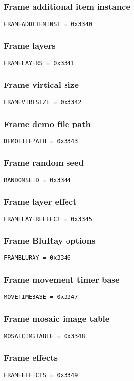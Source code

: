 \documentclass{article}
\begin{document}
\subsubsection{Frame additional item instance}
\verb|FRAMEADDITEMINST = 0x3340|

\subsubsection{Frame layers}
\verb|FRAMELAYERS = 0x3341|

\subsubsection{Frame virtical size}
\verb|FRAMEVIRTSIZE = 0x3342|

\subsubsection{Frame demo file path}
\verb|DEMOFILEPATH = 0x3343|

\subsubsection{Frame random seed}
\verb|RANDOMSEED = 0x3344|

\subsubsection{Frame layer effect}
\verb|FRAMELAYEREFFECT = 0x3345|

\subsubsection{Frame BluRay options}
\verb|FRAMBLURAY = 0x3346|

\subsubsection{Frame movement timer base}
\verb|MOVETIMEBASE = 0x3347|

\subsubsection{Frame mosaic image table}
\verb|MOSAICIMGTABLE = 0x3348|

\subsubsection{Frame effects}
\verb|FRAMEEFFECTS = 0x3349|
\end{document}
